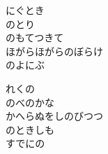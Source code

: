 \documentclass[10pt,b5j]{tarticle} %
\begin{document}
\begin{enumerate}
\begin{minipage}[c]{\blocksize}
        \vspace{\linespace}
        \item
        にぐとき\\
        のとり\\
        のもてつきて\\
        ほがらほがらのぼらけ\\
        のよにぶ
        
        \vspace{\linespace}
        \item
        れくの\\
        のべのかな\\
        かへらぬをしのびつつ\\
        のときしも\\
        すでにの
    
    \end{minipage}
\end{enumerate} %
\end{document}

